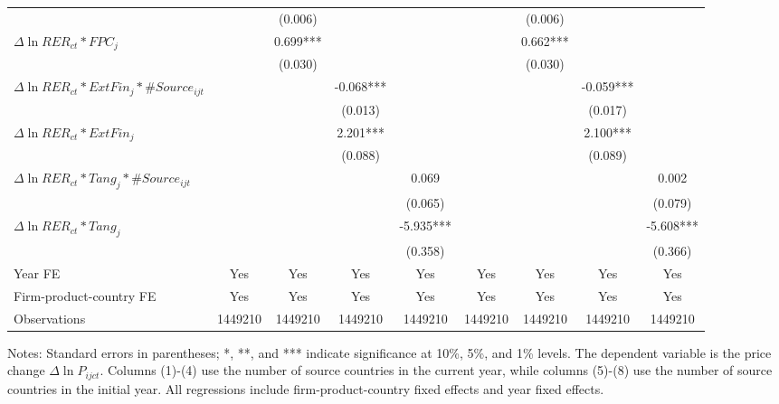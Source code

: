 \documentclass[12pt]{article}
\begin{document}
\begin{table}
{\begin{threeparttable}
\begin{tabular}{lcccccccc}
			&       & (0.006) &       &  &       & (0.006) &       &\\
			$\Delta \ln RER_{ct}*FPC_{j}$ &       & 0.699*** &       &  &       & 0.662*** &       &\\
			&       & (0.030) &       & &       & (0.030) &       & \\
			$\Delta \ln RER_{ct}*ExtFin_{j}*\#Source_{ijt}$ &       &    &   -0.068*** &  &       &    &   -0.059*** &\\
			&       &       & (0.013) &  &       &       & (0.017) &\\
			$\Delta \ln RER_{ct}*ExtFin_{j}$ &       &       & 2.201*** &   &       &       & 2.100*** &\\
			&       &       & (0.088) &  &       &       & (0.089) &\\
			$\Delta \ln RER_{ct}*Tang_{j}*\#Source_{ijt}$ &       &       &       & 0.069 &       &       &       & 0.002\\
			&       &       &       & (0.065) &       &       &       & (0.079)\\
			$\Delta \ln RER_{ct}*Tang_{j}$ &       &       &       & -5.935*** &       &       &       & -5.608***\\
			&       &       &       & (0.358) &       &       &       & (0.366)\\
			Year FE  & Yes   & Yes   & Yes   & Yes & Yes   & Yes   & Yes   & Yes\\
			Firm-product-country FE & Yes   & Yes   & Yes   & Yes & Yes   & Yes   & Yes   & Yes\\
			Observations & 1449210 & 1449210 & 1449210 & 1449210 & 1449210 & 1449210 & 1449210 & 1449210\\
			\bottomrule
		\end{tabular}
		\begin{tablenotes}
			\footnotesize
			\item[Notes:] Standard errors in parentheses; *, **, and *** indicate significance at 10\%, 5\%, and 1\% levels. The dependent variable is the price change $\Delta \ln P_{ijct}$. Columns (1)-(4) use the number of source countries in the current year, while columns (5)-(8) use the number of source countries in the initial year. All regressions include firm-product-country fixed effects and year fixed effects.
		\end{tablenotes}
	\end{threeparttable}
	}
	\label{tab.source}
\end{table}
\end{document}
